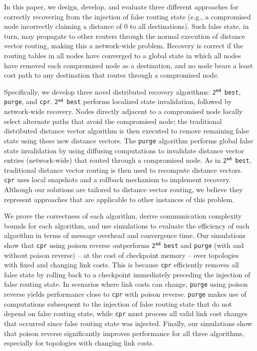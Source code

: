 \documentclass[10pt,conference]{IEEEtran}
\newcommand{\second}{{{\tt 2}$^{{\tt nd}}$ {\tt best} }}
\newcommand{\seconds}{{{\tt 2}$^{{\tt nd}}$ {\tt best}}}
\newcommand{\purge}{{{\tt purge} }}
\newcommand{\purges}{{{\tt purge}}}
\newcommand{\cpr}{{\tt cpr} }
\newcommand{\cprs}{{\tt cpr}}
\begin{document}
In this paper, we design, develop, and evaluate three different approaches for correctly recovering from the injection of false routing state (e.g., a compromised node incorrectly
claiming a distance of $0$ to all destinations). Such false state, in turn, may propagate to other routers through the normal execution of distance vector routing, making this
a network-wide problem. Recovery is correct if the routing tables in all nodes have converged to a global state in which all nodes have removed each compromised node as a destination,
and no node bears a least cost path to any destination that routes through a compromised node.

Specifically, we develop three novel distributed recovery algorithms: \seconds, \purges, and \cprs. \second performs localized state invalidation, followed by network-wide recovery. 
Nodes directly adjacent to a compromised node locally select alternate paths that avoid the compromised node; the traditional distributed distance vector algorithm is then executed to 
remove remaining false state using these new distance vectors. The \purge algorithm performs global false state invalidation by using diffusing computations to invalidate distance vector 
entries (network-wide) that routed through a compromised node. As in \seconds, traditional distance vector routing is then used to recompute distance vectors. \cpr uses local snapshots 
and a rollback mechanism to implement recovery. Although our solutions are tailored to distance vector routing, we believe they represent approaches that are applicable to other instances
of this problem.

We prove the correctness of each algorithm, derive communication complexity bounds for each algorithm, and use simulations to evaluate the efficiency of each algorithm in
terms of message overhead and convergence time.
Our simulations show that \cpr using poison reverse outperforms \second and \purge (with and without poison reverse) -- at the cost of checkpoint memory --
over topologies with fixed and changing link costs. This is because \cpr efficiently removes all false state by rolling back to a checkpoint
immediately preceding the injection of false routing state. 
In scenarios where link costs can change, \purge using poison reverse yields performance close to \cpr with poison reverse. \purge makes 
use of computations subsequent to the injection of false routing state that do not depend on false routing state, while \cpr 
must process all valid link cost changes that occurred since false routing state was injected.  Finally, our simulations show that poison reverse significantly improves 
performance for all three algorithms, especially for topologies with changing link costs. %
\end{document}
